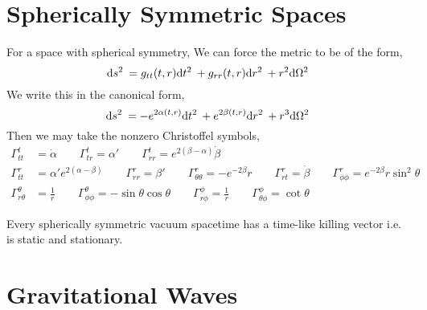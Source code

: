 \documentclass[11pt, a4paper]{article}
\begin{document}
\section{Spherically Symmetric Spaces}

For a space with spherical symmetry, We can force the metric to be of the form,
\[ \mathrm{d}s^2 \: = g_{tt}(t, r) \mathrm{d}t^2 \: + g_{rr}(t, r)  \mathrm{d}r^2 \: + r^2 \mathrm{d}\Omega^2 \: \] 
We write this in the canonical form,
\[ \mathrm{d}s^2 \: = - e^{2 \alpha(t,r)} \mathrm{d}t^2 \: + e^{2 \beta(t, r)} \mathrm{d}r^2 \: +  r^3 \mathrm{d}\Omega^2 \: \]
Then we may take the nonzero Christoffel symbols,
\begin{align*}
\Gamma^t_{tt} & = \dot{\alpha} \quad \quad \Gamma^t_{tr} = \alpha' \quad \quad \Gamma^t_{rr} = e^{2(\beta - \alpha)} \dot{\beta}
\\
\Gamma^r_{tt} & = \alpha' e^{2(\alpha - \beta)} \quad \quad \Gamma^r_{rr} = \beta' \quad \quad \Gamma^r_{\theta \theta} = - e^{-2 \beta} r \quad \quad \Gamma^r_{rt} = \dot{\beta} \quad \quad \Gamma^r_{\phi \phi} = e^{-2 \beta} r \sin^2{\theta} 
\\
\Gamma^\theta_{r \theta} & = \frac{1}{r} \quad \quad \Gamma^\theta_{\phi \phi} = - \sin{\theta} \cos{\theta} \quad \quad \Gamma^\phi_{r\phi} = \frac{1}{r} \quad \quad \Gamma^\phi_{\theta \phi} = \cot{\theta}
\end{align*}

\begin{theorem}[Birkhoff]
Every spherically symmetric vacuum spacetime has a time-like killing vector i.e. is static and stationary. 
\end{theorem}

\section{Gravitational Waves}
\end{document}
